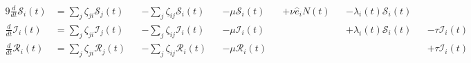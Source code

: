 \begin{alignat}{9}
\frac{d}{dt}\mathcal{S}_i(t) &=
        \sum_j \zeta_{ji} \mathcal{S}_j(t)
&&    - \sum_j \zeta_{ij} \mathcal{S}_i(t)
&&    - \mu \mathcal{S}_i(t)
&&    + \nu \hat{e}_i N(t)
&&    - \lambda_i(t) \mathcal{S}_i(t)
\\
\frac{d}{dt}\mathcal{I}_i(t) &=
        \sum_j \zeta_{ji} \mathcal{I}_j(t)
&&    - \sum_j \zeta_{ij} \mathcal{I}_i(t)
&&    - \mu \mathcal{I}_i(t)
&&&&  + \lambda_i(t) \mathcal{S}_i(t)
&&    - \tau \mathcal{I}_i(t)
\\
\frac{d}{dt}\mathcal{R}_i(t) &=
        \sum_j \zeta_{ji} \mathcal{R}_j(t)
&&    - \sum_j \zeta_{ij} \mathcal{R}_i(t)
&&    - \mu \mathcal{R}_i(t)
&&&&&&+ \tau \mathcal{I}_i(t)
\end{alignat}